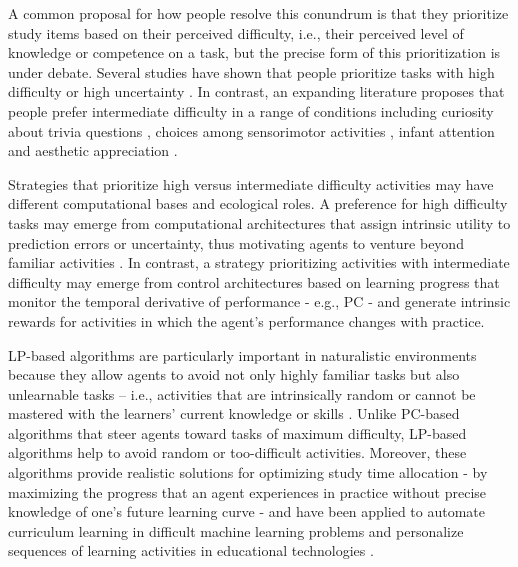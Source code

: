 A common proposal for how people resolve this conundrum is that they prioritize study items based on their perceived difficulty, i.e., their perceived level of knowledge or competence on a task, but the precise form of this prioritization is under debate. Several studies have shown  that people prioritize tasks with high difficulty or high uncertainty \parencite{loewenstein_psychology_1994,schulz_structured_2019}. In contrast, an expanding literature proposes that people prefer intermediate difficulty \parencite{berlyne1960conflict} in a range of conditions including curiosity about trivia questions \parencite{kang_wick_2009,baranes_eye_2015}, choices among sensorimotor activities \parencite{baranes_effects_2014}, infant attention \parencite{kidd_goldilocks_2012} and aesthetic appreciation \parencite{tsutsui_complexity_2011,gold_predictability_2019}.
 
Strategies that prioritize high versus intermediate difficulty activities may have different computational bases and ecological roles. A preference for high difficulty tasks may emerge from computational architectures that assign intrinsic utility to prediction errors or uncertainty, thus motivating agents to venture beyond familiar activities  \parencite{dayan1996exploration,bellemare_unifying_2016,pathak_curiosity-driven_2017,schulz_structured_2019}. In contrast, a strategy prioritizing activities with intermediate difficulty may emerge from control architectures based on learning progress \parencite[\ac{LP};][]{kaplan_search_2007,schmidhuber2010formal,graves_automated_2017,twomey_curiosity-based_2018,colas_curious_2019,kim_active_2020} that monitor the temporal derivative of performance - e.g., \acf{PC} - and generate intrinsic rewards for activities in which the agent's performance changes with practice.  

\ac{LP}-based algorithms are particularly important in naturalistic environments because they allow agents to avoid not only highly familiar tasks but also unlearnable tasks – i.e., activities that are intrinsically random or cannot be mastered with the learners’ current knowledge or skills \parencite{oudeyer_intrinsic_2007,forestier_intrinsically_2020,kim_active_2020}. Unlike \ac{PC}-based algorithms that steer agents toward tasks of maximum difficulty, \ac{LP}-based algorithms help to avoid random or too-difficult  activities. Moreover, these algorithms provide realistic solutions for optimizing study time allocation - by maximizing the progress that an agent experiences in practice without precise knowledge of one’s future learning curve \parencite{son_metacognitive_2006,lopes_strategic_2012} - and have been applied to automate curriculum learning in difficult machine learning problems \parencite{graves_automated_2017, matiisen2019teacher,portelas2020automatic} and personalize sequences of learning activities in educational technologies \parencite{clement:hal-00913669,oudeyer2016intrinsic,mu2018combining}.

